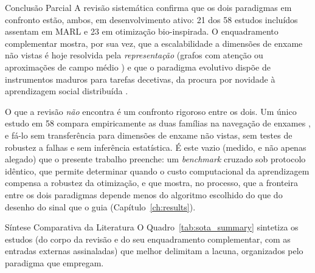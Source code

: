 \documentclass[12pt,reqno, twoside]{amsbook}
\makeatletter
\def\section{\@startsection{section}{1}%
      \z@{.5\linespacing\@plus.7\linespacing}{.25\linespacing}%
      {\normalfont\bfseries\flushleft}}
\theoremstyle{plain}
\numberwithin{equation}{chapter}
\numberwithin{section}{chapter}
\numberwithin{table}{chapter}
\numberwithin{figure}{chapter}
\makeatother
\begin{document}
\section{Conclusão Parcial}
A revisão sistemática confirma que os dois paradigmas em confronto estão, ambos, em desenvolvimento ativo: 21 dos 58 estudos incluídos assentam em MARL e 23 em otimização bio-inspirada. O enquadramento complementar mostra, por sua vez, que a escalabilidade a dimensões de enxame não vistas é hoje resolvida pela \emph{representação} (grafos com atenção \cite{chen2024graph, zhang2022h2gnn} ou aproximações de campo médio \cite{tang2023meanfield}) e que o paradigma evolutivo dispõe de instrumentos maduros para tarefas decetivas, da procura por novidade \cite{hasselmann2023novelty} à aprendizagem social distribuída \cite{bredeche2022social}.

O que a revisão \emph{não} encontra é um confronto rigoroso entre os dois. Um único estudo em 58 compara empiricamente as duas famílias na navegação de enxames \cite{iskandar2024comparative}, e fá-lo sem transferência para dimensões de enxame não vistas, sem testes de robustez a falhas e sem inferência estatística. É este vazio (medido, e não apenas alegado) que o presente trabalho preenche: um \textit{benchmark} cruzado sob protocolo idêntico, que permite determinar quando o custo computacional da aprendizagem compensa a robustez da otimização, e que mostra, no processo, que a fronteira entre os dois paradigmas depende menos do algoritmo escolhido do que do desenho do sinal que o guia (Capítulo~\ref{ch:results}).

\section{Síntese Comparativa da Literatura}
O Quadro~\ref{tab:sota_summary} sintetiza os estudos (do corpo da revisão e do seu enquadramento complementar, com as entradas externas assinaladas) que melhor delimitam a lacuna, organizados pelo paradigma que empregam.
\end{document}
